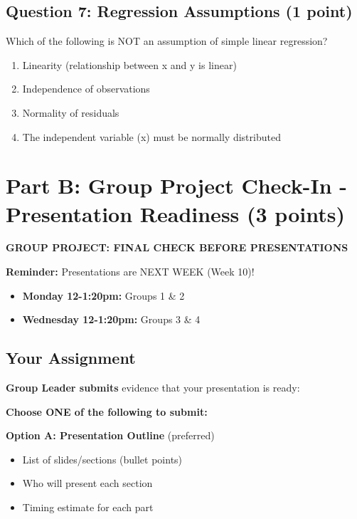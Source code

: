 \documentclass[10pt]{article}
\begin{document}
\subsection*{Question 7: Regression Assumptions (1 point)}
Which of the following is NOT an assumption of simple linear regression?
\begin{enumerate}[label=\Alph*., leftmargin=20pt]
\item Linearity (relationship between x and y is linear)
\item Independence of observations
\item Normality of residuals
\item The independent variable (x) must be normally distributed
\end{enumerate}

\newpage

\section*{Part B: Group Project Check-In - Presentation Readiness (3 points)}

\begin{tcolorbox}[colback=aiblue!10,colframe=aiblue,boxrule=1pt,arc=2pt,left=6pt,right=6pt,top=6pt,bottom=6pt]
\textbf{GROUP PROJECT: FINAL CHECK BEFORE PRESENTATIONS}
\end{tcolorbox}

\vspace{4pt}

\textbf{Reminder:} Presentations are NEXT WEEK (Week 10)!
\begin{itemize}[leftmargin=20pt]
\item \textbf{Monday 12-1:20pm:} Groups 1 \& 2
\item \textbf{Wednesday 12-1:20pm:} Groups 3 \& 4
\end{itemize}

\subsection*{Your Assignment}

\textbf{Group Leader submits} evidence that your presentation is ready:

\textbf{Choose ONE of the following to submit:}

\textbf{Option A: Presentation Outline} (preferred)
\begin{itemize}[leftmargin=20pt]
\item List of slides/sections (bullet points)
\item Who will present each section
\item Timing estimate for each part
\end{itemize}
\end{document}
